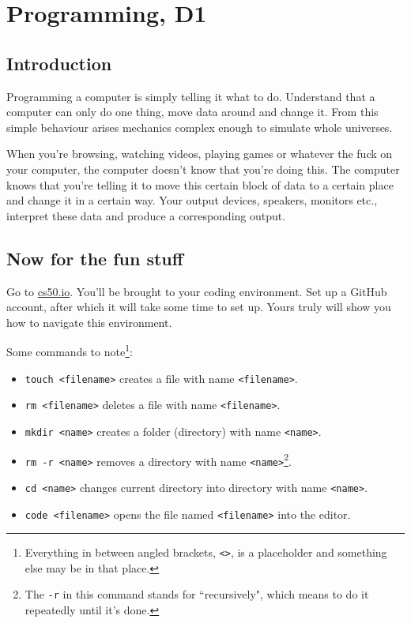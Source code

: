 \documentclass{article}
\begin{document}
\section*{Programming, D1}

\subsection*{Introduction}
Programming a computer is simply telling it what to do. Understand that a computer can only do
one thing, move data around and change it. From this simple behaviour arises mechanics complex
enough to simulate whole universes.

When you're browsing, watching videos, playing games or whatever the fuck on your computer, the
computer doesn't know that you're doing this. The computer knows that you're telling it to move
this certain block of data to a certain place and change it in a certain way. Your output devices,
speakers, monitors etc., interpret these data and produce a corresponding output.

\subsection*{Now for the fun stuff}
Go to \href{https://code.cs50.io}{cs50.io}. You'll be brought to your coding environment. Set up
a GitHub account, after which it will take some time to set up. Yours truly will show you how to 
navigate this environment.

Some commands to note\footnote{Everything in between angled brackets, \Verb|<>|, is a placeholder
and something else may be in that place.}:
\begin{itemize}
	\item \verb|touch <filename>| creates a file with name \verb|<filename>|.
	\item \verb|rm <filename>| deletes a file with name \verb|<filename>|.
	\item \verb|mkdir <name>| creates a folder (directory) with name \verb|<name>|.
	\item \verb|rm -r <name>| removes a directory with name \verb|<name>|\footnote{The \Verb|-r| in
	this command stands for ``recursively", which means to do it repeatedly until it's done.}.
	\item \verb|cd <name>| changes current directory into directory with name \verb|<name>|.
	\item \verb|code <filename>| opens the file named \verb|<filename>| into the editor.
\end{itemize}
\end{document}
